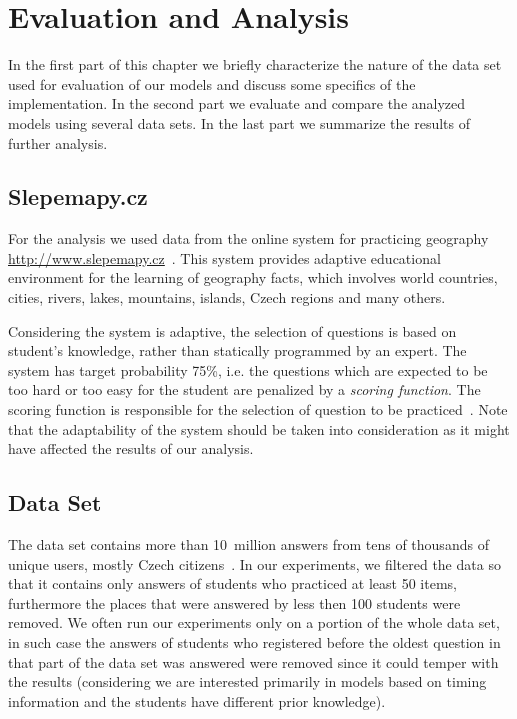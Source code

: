 \chapter{Evaluation and Analysis}

In the first part of this chapter we briefly characterize the nature of the data set used for evaluation of our models and discuss some specifics of the implementation. In the second part we evaluate and compare the analyzed models using several data sets. In the last part we summarize the results of further analysis.

\section{Slepemapy.cz}

For the analysis we used data from the online system for practicing geography \url{http://www.slepemapy.cz}~\cite{Papousek2014}. This system provides adaptive educational environment for the learning of geography facts, which involves world countries, cities, rivers, lakes, mountains, islands, Czech regions and many others.

Considering the system is adaptive, the selection of questions is based on student's knowledge, rather than statically programmed by an expert. The system has target probability 75\%, i.e. the questions which are expected to be too hard or too easy for the student are penalized by a \textit{scoring function}. The scoring function is responsible for the selection of question to be practiced~\cite{Stanislav2015thesis}. Note that the adaptability of the system should be taken into consideration as it might have affected the results of our analysis.

\section{Data Set}

The data set contains more than 10~million answers from tens of thousands of unique users, mostly Czech citizens~\cite{Papousek2015}. In our experiments, we filtered the data so that it contains only answers of students who practiced at least 50 items, furthermore the places that were answered by less then 100 students were removed. We often run our experiments only on a portion of the whole data set, in such case the answers of students who registered before the oldest question in that part of the data set was answered were removed since it could temper with the results (considering we are interested primarily in models based on timing information and the students have different prior knowledge).

